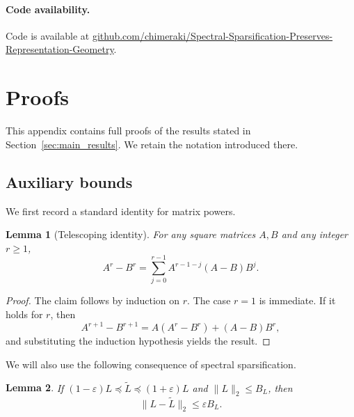 \documentclass{article}
\newtheorem{lemma}{Lemma}
\begin{document}
\paragraph{Code availability.}
Code is available at \url{github.com/chimeraki/Spectral-Sparsification-Preserves-Representation-Geometry}.





\appendix

\section{Proofs}
\label{app:proofs}

This appendix contains full proofs of the results stated in Section~\ref{sec:main_results}. We retain the notation introduced there.

\subsection{Auxiliary bounds}
\label{app:auxiliary}

We first record a standard identity for matrix powers.

\begin{lemma}[Telescoping identity]
\label{lem:telescoping}
For any square matrices $A,B$ and any integer $r\ge 1$,
\[
A^r - B^r = \sum_{j=0}^{r-1} A^{r-1-j}(A-B)B^j.
\]
\end{lemma}

\begin{proof}
The claim follows by induction on $r$. The case $r=1$ is immediate. If it holds for $r$, then
\[
A^{r+1}-B^{r+1}
=
A(A^r-B^r)+(A-B)B^r,
\]
and substituting the induction hypothesis yields the result.
\end{proof}

We will also use the following consequence of spectral sparsification.

\begin{lemma}
\label{lem:operator_diff}
If $(1-\varepsilon)L \preceq \widetilde L \preceq (1+\varepsilon)L$ and $\|L\|_2\le B_L$, then
\[
\|L-\widetilde L\|_2 \le \varepsilon B_L.
\]
\end{lemma}
\end{document}
